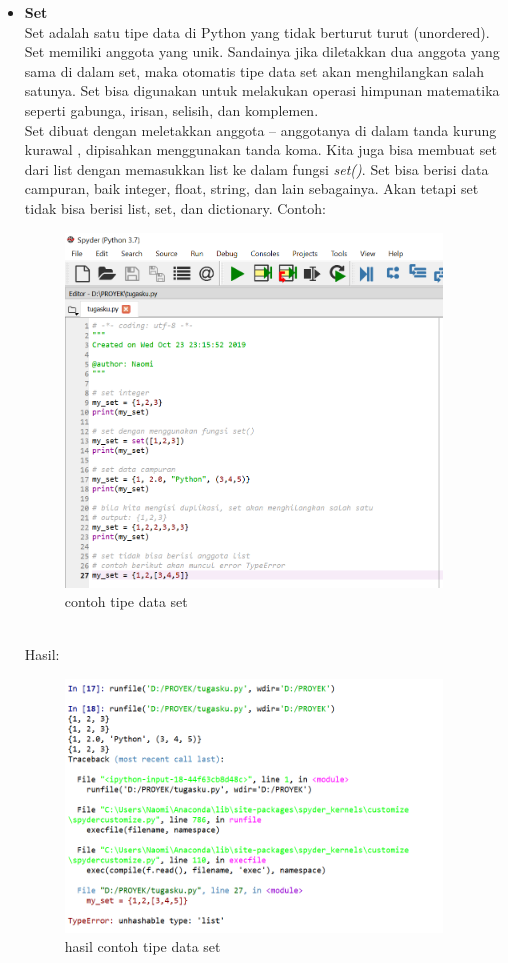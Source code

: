 \begin{enumerate}
\begin{itemize}
\item \textbf{Set}\\
Set adalah satu tipe data di Python yang tidak berturut turut (unordered). Set memiliki anggota yang unik. Sandainya jika diletakkan dua anggota yang sama di dalam set, maka otomatis tipe data set akan menghilangkan salah satunya. Set bisa digunakan untuk melakukan operasi himpunan matematika seperti gabunga, irisan, selisih, dan komplemen.\\Set dibuat dengan meletakkan  anggota – anggotanya di dalam tanda kurung kurawal { }, dipisahkan menggunakan tanda koma. Kita juga bisa membuat set dari list dengan memasukkan list ke dalam fungsi \textit{set()}. Set bisa berisi data campuran, baik integer, float, string, dan lain sebagainya. Akan tetapi set tidak bisa berisi list, set, dan dictionary. Contoh:
\begin{figure}[!htbp]
\centering
\includegraphics[width=10cm]{gambar2/cth5.png}
\caption{contoh tipe data set}
\end{figure}\\
Hasil:
\begin{figure}[!htbp]
\centering
\includegraphics[width=10cm]{gambar2/hsl5.png}
\caption{hasil contoh tipe data set}
\end{figure}


\end{itemize}
\end{enumerate}
